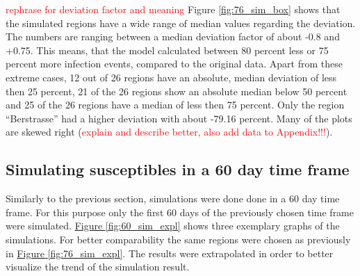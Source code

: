 \textcolor{red}{rephrase for deviation factor and meaning}
Figure \ref*{fig:76_sim_box} shows that the simulated regions have a wide range of median values regarding the deviation.
The numbers are ranging between a median deviation factor of about -0.8 and +0.75. This means, that the model calculated
between 80 percent less or 75 percent more infection events, compared to the original data. Apart from these extreme cases, 12 out of
26 regions have an absolute, median deviation of less then 25 percent, 21 of the 26 regions show an absolute median below 50 percent
and 25 of the 26 regions have a median of less then 75 percent. Only the region ``Berstrasse'' had a higher deviation with
about -79.16 percent. Many of the plots are skewed right (\textcolor{red}{explain and describe better, also add data to Appendix!!!}).



\subsection{Simulating susceptibles in a 60 day time frame}
Similarly to the previous section, simulations were done done in a 60 day time frame. For this purpose only the first
60 days of the previously chosen time frame were simulated. \hyperref[fig:60_sim_expl]{Figure \ref*{fig:60_sim_expl}}
shows three exemplary graphs of the simulations. For better comparability the same regions were chosen as previously
in \hyperref[fig:76_sim_expl]{Figure \ref*{fig:76_sim_expl}}. The results were extrapolated in order to better visualize
the trend of the simulation result.


